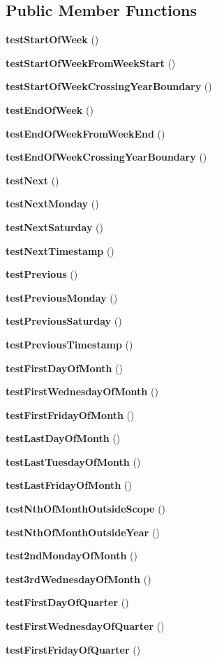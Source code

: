 \subsection*{Public Member Functions}
\begin{DoxyCompactItemize}
\item 
{\bf test\+Start\+Of\+Week} ()
\item 
{\bf test\+Start\+Of\+Week\+From\+Week\+Start} ()
\item 
{\bf test\+Start\+Of\+Week\+Crossing\+Year\+Boundary} ()
\item 
{\bf test\+End\+Of\+Week} ()
\item 
{\bf test\+End\+Of\+Week\+From\+Week\+End} ()
\item 
{\bf test\+End\+Of\+Week\+Crossing\+Year\+Boundary} ()
\item 
{\bf test\+Next} ()
\item 
{\bf test\+Next\+Monday} ()
\item 
{\bf test\+Next\+Saturday} ()
\item 
{\bf test\+Next\+Timestamp} ()
\item 
{\bf test\+Previous} ()
\item 
{\bf test\+Previous\+Monday} ()
\item 
{\bf test\+Previous\+Saturday} ()
\item 
{\bf test\+Previous\+Timestamp} ()
\item 
{\bf test\+First\+Day\+Of\+Month} ()
\item 
{\bf test\+First\+Wednesday\+Of\+Month} ()
\item 
{\bf test\+First\+Friday\+Of\+Month} ()
\item 
{\bf test\+Last\+Day\+Of\+Month} ()
\item 
{\bf test\+Last\+Tuesday\+Of\+Month} ()
\item 
{\bf test\+Last\+Friday\+Of\+Month} ()
\item 
{\bf test\+Nth\+Of\+Month\+Outside\+Scope} ()
\item 
{\bf test\+Nth\+Of\+Month\+Outside\+Year} ()
\item 
{\bf test2nd\+Monday\+Of\+Month} ()
\item 
{\bf test3rd\+Wednesday\+Of\+Month} ()
\item 
{\bf test\+First\+Day\+Of\+Quarter} ()
\item 
{\bf test\+First\+Wednesday\+Of\+Quarter} ()
\item 
{\bf test\+First\+Friday\+Of\+Quarter} ()
\item 

\end{DoxyCompactItemize}
